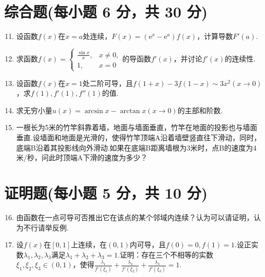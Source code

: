 \documentclass[../Main.tex]{subfiles}
\begin{document}
\section{综合题(每小题 6 分，共 30 分)}
\begin{enumerate}
    \setcounter{enumi}{10}
    \item 设函数$f(x)$在$x=a$处连续，$F(x)=(\mathrm{e}^{x}-\mathrm{e}^{a})f(
              x)$，计算导数$F'(a)$.
          \vspace{10em}

    \item 求函数$f(x)=
              \begin{cases}
                  \frac{\sin x}{x}, & x\neq0, \\
                  1,                & x=0
              \end{cases}$的导函数$f'(x)$，并讨论$f'(x)$的连续性.
          \vspace{10em}

    \item 设函数$f(x)$在$x=1$处二阶可导，且$f(1+x)-3f(1-x)\sim 3x^{2}(x\to 0
              )$，求$f(1),f'(1),f''(1)$的值.
          \vspace{10em}

    \item 求无穷小量$u(x)=\arcsin x-\arctan x(x\to0)$的主部和阶数.
          \vspace{10em}

    \item 一根长为5米的竹竿斜靠着墙，地面与墙面垂直，竹竿在地面的投影也与墙面垂直.设墙面和地面是光滑的，使得竹竿顶端A沿着墙壁竖直往下滑动，同时，底端B沿着其投影线向外滑动.如果在底端B距离墙根为3米时，点B的速度为4米/秒，问此时顶端A下滑的速度为多少？
          \vspace{12em}
\end{enumerate}

\section{证明题(每小题 5 分，共 10 分)}
\begin{enumerate}
    \setcounter{enumi}{15}
    \item 由函数在一点可导可否推出它在该点的某个邻域内连续？认为可以请证明，认为不行请举反例.
          \vspace{12em}

    \item 设$f(x)$在$[0,1]$上连续，在$(0,1)$内可导，且$f(0)=0,f(1)=1$.设正实数$\lambda
              _{1},\lambda_{2},\lambda_{3}$满足$\lambda_{1}+\lambda_{2}+\lambda_{3}=1$.证明：存在三个不相等的实数$\xi
              _{1},\xi_{2},\xi_{3}\in(0,1)$，使得$\frac{\lambda_{1}}{f'(\xi_{1})}+\frac{\lambda_{2}}{f'(\xi_{2})}
              +\frac{\lambda_{3}}{f'(\xi_{3})}=1$.
          \vspace{12em}
\end{enumerate}
\end{document}
